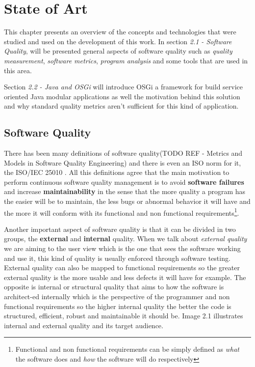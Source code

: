\chapter{State of Art}
This chapter presents an overview of the concepts and technologies that were studied and used on the development of this work. 
In section \textit{2.1 - Software Quality}, will be presented general aspects of software quality such as \textit{quality measurement},  \textit{software metrics}, \textit{program analysis} and some tools that are used in this area.  

Section \textit{2.2 - Java and OSGi} will introduce OSGi a framework for build service oriented Java modular applications as well the motivation 
behind this solution and why standard quality metrics aren't sufficient for this kind of application. 


\section{Software Quality}
\label{sec:quality}
There has been many definitions of software quality(TODO REF - Metrics and Models in Software Quality Engineering) and there is even an ISO norm for it, the ISO/IEC 25010 \citep{iso 2011}. All this definitions agree that the main motivation to perform continuous software quality management is to avoid \textbf{software failures} and increase \textbf{maintainability} in the sense that the more quality a program has the easier will be to maintain, the less bugs or abnormal behavior it will have and the more it will conform with its functional and non functional requirements\footnote{Functional and non functional requirements can be simply defined as \textit{what} the software does and \textit{how} the software will do respectively}. 

Another important aspect of software quality is that it can be divided in two groups, the \textbf{external} and \textbf{internal} quality. When we talk about \textit{external quality} we are aiming to the user view which is the one that sees the software working and use it, this kind of quality is usually enforced through software testing. External quality can also be mapped to functional requirements so the greater external quality is the more usable and less defects it will have for example. The opposite is internal or structural quality that aims to how the software is architect-ed internally which is the perspective of the programmer and non functional requirements so the higher internal quality the better the code is structured, efficient, robust and maintainable it should be. Image 2.1 illustrates internal and external quality and its target audience.


